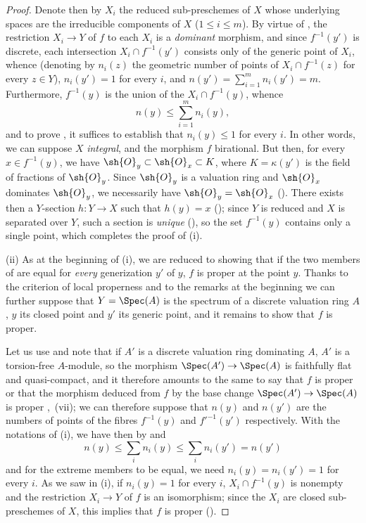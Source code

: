 \begin{proof}
Denote then by $X_i$ the reduced sub-preschemes of $X$ whose underlying spaces are the irreducible components of $X$ ($1\leq i\leq m$).
By virtue of , the restriction $X_i\to Y$ of $f$ to each $X_i$ is a \emph{dominant} morphism, and since $f^{-1}(y')$ is discrete, each intersection $X_i\cap f^{-1}(y')$ consists only of the generic point of $X_i$, whence (denoting by $n_i(z)$ the geometric number of points of $X_i\cap f^{-1}(z)$ for every $z\in Y$), $n_i(y')=1$ for every $i$, and $n(y')=\sum_{i=1}^{m} n_i(y')=m$.
Furthermore, $f^{-1}(y)$ is the union of the $X_i\cap f^{-1}(y)$, whence
\begin{equation}
\tag{15.5.2.3}
\label{IV.15.5.2.3}
  n(y) \leq \sum_{i=1}^{m} n_i(y),
\end{equation}
and to prove , it suffices to establish that $n_i(y)\leq 1$ for every $i$.
In other words, we can suppose $X$ \emph{integral}, and the morphism $f$ birational.
But then, for every $x\in f^{-1}(y)$, we have $\sh{O}_y\subset\sh{O}_x\subset K$, where $K=\kappa(y')$ is the field of fractions of $\sh{O}_y$.
Since $\sh{O}_y$ is a valuation ring and $\sh{O}_x$ dominates $\sh{O}_y$, we necessarily have $\sh{O}_y=\sh{O}_x$ ().
There exists then a $Y$-section $h:Y\to X$ such that $h(y)=x$ (); since $Y$ is reduced and $X$ is separated over $Y$, such a section is \emph{unique} (), so the set $f^{-1}(y)$ contains only a single point, which completes the proof of (i).

(ii)
As at the beginning of (i), we are reduced to showing that if the two members of  are equal for \emph{every} generization $y'$ of $y$, $f$ is proper at the point $y$.
Thanks to the criterion of local properness  and to the remarks at the beginning we can further suppose that $Y=\Spec(A)$ is the spectrum of a discrete valuation ring $A$, $y$ its closed point and $y'$ its generic point, and it remains to show that $f$ is proper.

Let us use  and note that if $A'$ is a discrete valuation ring dominating $A$, $A'$ is a torsion-free $A$-module, so the morphism $\Spec(A')\to\Spec(A)$ is faithfully flat and quasi-compact, and it therefore amounts to the same to say that $f$ is proper or that the morphism deduced from $f$ by the base change $\Spec(A')\to\Spec(A)$ is
proper ,~(vii); we can therefore suppose that $n(y)$ and $n(y')$ are the numbers of points of the fibres $f^{-1}(y)$ and $f'^{-1}(y')$ respectively.
With the notations of (i), we have then by  and 
\begin{equation}
\tag{15.5.2.4}
\label{IV.15.5.2.4}
  n(y) \leq \sum_i n_i(y) \leq \sum_i n_i(y') = n(y')
\end{equation}
and for the extreme members to be equal, we need $n_i(y)=n_i(y')=1$ for every $i$.
As we saw in (i), if $n_i(y)=1$ for every $i$, $X_i\cap f^{-1}(y)$ is nonempty and the restriction $X_i\to Y$ of $f$ is an isomorphism; since the $X_i$ are closed sub-preschemes of $X$, this implies that $f$ is proper ().


\end{proof}
